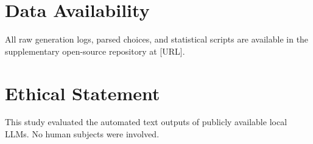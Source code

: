 \section*{Data Availability}
All raw generation logs, parsed choices, and statistical scripts are available in the supplementary open-source repository at [URL]. 

\section*{Ethical Statement}
This study evaluated the automated text outputs of publicly available local LLMs. No human subjects were involved. 





